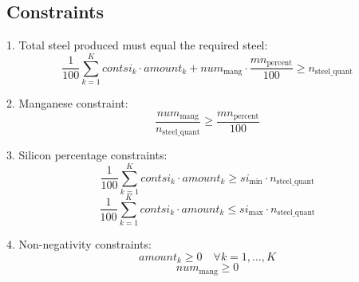 \documentclass{article}
\begin{document}
\subsection*{Constraints}
1. Total steel produced must equal the required steel:
\[
\frac{1}{100} \sum_{k=1}^{K} contsi_k \cdot amount_k + num_{\text{mang}} \cdot \frac{mn_{\text{percent}}}{100} \geq n_{\text{steel\_quant}} 
\]

2. Manganese constraint:
\[
\frac{num_{\text{mang}}}{n_{\text{steel\_quant}}} \geq \frac{mn_{\text{percent}}}{100}
\]

3. Silicon percentage constraints:
\[
\frac{1}{100} \sum_{k=1}^{K} contsi_k \cdot amount_k \geq si_{\text{min}} \cdot n_{\text{steel\_quant}} 
\]
\[
\frac{1}{100} \sum_{k=1}^{K} contsi_k \cdot amount_k \leq si_{\text{max}} \cdot n_{\text{steel\_quant}} 
\]

4. Non-negativity constraints:
\[
amount_k \geq 0 \quad \forall k = 1, \ldots, K
\]
\[
num_{\text{mang}} \geq 0
\]
\end{document}
